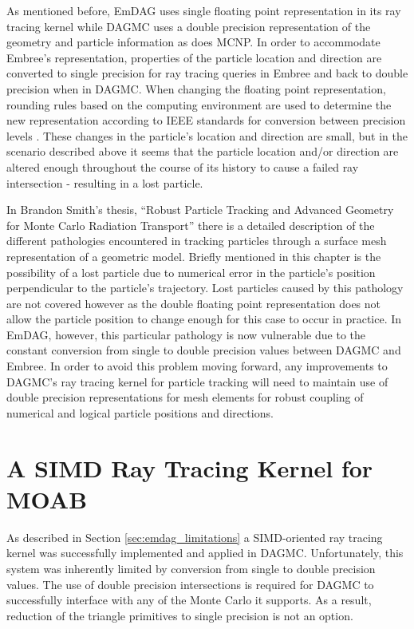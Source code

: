 As mentioned before, EmDAG uses single floating point representation in its ray
tracing kernel while DAGMC uses a double precision representation of the
geometry and particle information as does MCNP. In order to accommodate Embree's
representation, properties of the particle location and direction are converted
to single precision for ray tracing queries in Embree and back to double
precision when in DAGMC. When changing the floating point representation,
rounding rules based on the computing environment are used to determine the new
representation according to IEEE standards for conversion between precision
levels \cite{IEEE_STD_2008}. These changes in the particle's location and
direction are small, but in the scenario described above it seems that the
particle location and/or direction are altered enough throughout the course of
its history to cause a failed ray intersection - resulting in a lost particle.

In Brandon Smith's thesis, ``Robust Particle Tracking and Advanced Geometry for
Monte Carlo Radiation Transport'' \cite{Smith_2011} there is a detailed
description of the different pathologies encountered in tracking particles
through a surface mesh representation of a geometric model. Briefly mentioned in
this chapter is the possibility of a lost particle due to numerical error in the
particle's position perpendicular to the particle's trajectory. Lost particles
caused by this pathology are not covered however as the double floating point
representation does not allow the particle position to change enough for this
case to occur in practice. In EmDAG, however, this particular pathology is now
vulnerable due to the constant conversion from single to double precision values
between DAGMC and Embree. In order to avoid this problem moving forward, any
improvements to DAGMC's ray tracing kernel for particle tracking will need to
maintain use of double precision representations for mesh elements for robust
coupling of numerical and logical particle positions and directions.

\section{A SIMD Ray Tracing Kernel for MOAB}


As described in Section \ref{sec:emdag_limitations} a SIMD-oriented ray tracing
kernel was successfully implemented and applied in DAGMC. Unfortunately, this
system was inherently limited by conversion from single to double precision
values. The use of double precision intersections is required for DAGMC to
successfully interface with any of the Monte Carlo it supports. As a result,
reduction of the triangle primitives to single precision is not an option.

